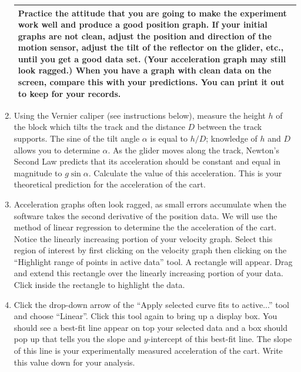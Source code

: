 \begin{enumerate}
\begin{center}
\begin{tabular}{|p{14cm}|}
\hline\tstrut
Practice the attitude that you are going to make the experiment work well and produce a good position graph.  If your initial graphs are not clean, adjust the position and direction of the motion sensor, adjust the tilt of the reflector on the glider, etc., until you get a good data set.  (Your acceleration graph may still look ragged.)  When you have a graph with clean data on the screen, compare this with your predictions.  You can print it out to keep for your records.  \bstrut\\
\hline
\end{tabular}
\end{center}

\item Using the Vernier caliper (see instructions below), measure the height \(h\) of the block which tilts the track and the distance \(D\) between the track supports.  The sine of the tilt angle \(\alpha\) is equal to \(h/D\); knowledge of \(h\) and \(D\) allows you to determine \(\alpha\).  As the glider moves along the track, Newton's Second Law predicts that its acceleration should be constant and equal in magnitude to \(g\sin\alpha\).  Calculate the value of this acceleration.  This is your theoretical prediction for the acceleration of the cart.

\item Acceleration graphs often look ragged, as small errors accumulate when the software takes the second derivative of the position data.  We will use the method of linear regression to determine the the acceleration of the cart.  Notice the linearly increasing portion of your velocity graph.  Select this region of interest by first clicking on the velocity graph then clicking on the ``Highlight range of points in active data'' tool.  A rectangle will appear.  Drag and extend this rectangle over the linearly increasing portion of your data.  Click inside the rectangle to highlight the data.

\item Click the drop-down arrow of the ``Apply selected curve fits to active...'' tool and choose ``Linear''.  Click this tool again to bring up a display box.  You should see a best-fit line appear on top your selected data and a box should pop up that tells you the slope and  \(y\)-intercept of this best-fit line.  The slope of this line is your experimentally measured acceleration of the cart.  Write this value down for your analysis. 


\end{enumerate}
